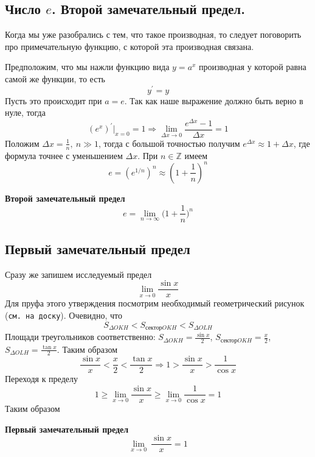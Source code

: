 \subsection{Число $e$. Второй замечательный предел.}
Когда мы уже разобрались с тем, что такое производная, то следует поговорить про примечательную функцию, с которой эта производная связана.

Предположим, что мы нажли функцию вида $y = a^x$ производная у которой равна самой же функции, то есть
\begin{equation*}
    y^{'} = y
\end{equation*}
Пусть это происходит при $a = e$. Так как наше выражение должно быть верно в нуле, тогда
\begin{equation*}
    (e^x)^{'}|_{x = 0} = 1 \Rightarrow \lim_{\Delta x \rightarrow 0} \frac{e^{\Delta x} - 1}{\Delta x} = 1
\end{equation*}
Положим $\Delta x = \frac{1}{n},\ n\gg 1$, тогда с большой точностью получим $e^{\Delta x} \approx 1 + \Delta x$, где формула точнее с уменьшением $\Delta x$. При $n \in \mathbb{Z}$ имеем
\begin{equation*}
    e = (e^{1/n})^{n} \approx (1 + \frac{1}{n})^{n}
\end{equation*}
\begin{theorem}
    \textbf{Второй замечательный предел}
    \begin{equation*}
        e = \lim_{n \rightarrow \infty} \bigl(1 + \frac{1}{n}\bigr)^{n}
    \end{equation*}
\end{theorem}

\subsection{Первый замечательный предел}
Сразу же запишем исследуемый предел
\begin{equation*}
    \lim_{x \rightarrow 0} \frac{\sin x}{x}
\end{equation*}
Для пруфа этого утверждения посмотрим необходимый геометрический рисунок (\texttt{см. на доску}). Очевидно, что
\begin{equation*}
    S_{\Delta OKH} < S_{\text{сектор} OKH} < S_{\Delta OLH}
\end{equation*}
Площади треугольников соответственно: $S_{\Delta OKH} = \frac{\sin x}{2}$, $S_{\text{сектор} OKH} = \frac{x}{2}$, $S_{\Delta OLH} = \frac{\tan x}{2}$. Таким образом
\begin{equation*}
    \frac{\sin x}{x} < \frac{x}{2} < \frac{\tan x}{2} \Rightarrow 1 > \frac{\sin x}{x} > \frac{1}{\cos x}
\end{equation*}
Переходя к пределу
\begin{equation*}
    1 \geq \lim_{x \rightarrow 0} \frac{\sin x}{x} \geq \lim_{x \rightarrow 0} \frac{1}{\cos x} = 1
\end{equation*}
Таким образом
\begin{theorem}
    \textbf{Первый замечательный предел}
    \begin{equation*}
        \lim_{x \rightarrow 0}\ \frac{\sin x}{x} = 1
    \end{equation*}
\end{theorem}